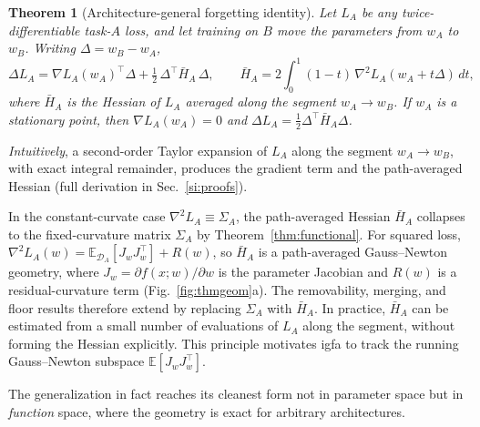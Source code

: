 \documentclass[10pt,a4paper]{article}
\theoremstyle{plain}
\newtheorem{theorem}{Theorem}
\theoremstyle{definition}
\newcommand{\Sig}{\Sigma}
\newcommand{\Del}{\Delta}
\newcommand{\IGFA}{igfa}
\begin{document}
\begin{theorem}[Architecture-general forgetting identity]
\label{thm:general}
Let $L_A$ be any twice-differentiable task-$A$ loss, and let training on $B$ move the
parameters from $w_A$ to $w_B$. Writing $\Del=w_B-w_A$,
\begin{equation}
\Del L_A=\nabla L_A(w_A)^\top\Del+\tfrac12\,\Del^\top \bar H_A\,\Del,
\qquad
\bar H_A=2\!\int_0^1(1-t)\,\nabla^2 L_A(w_A+t\Del)\,dt,
\label{eq:general}
\end{equation}
where $\bar H_A$ is the Hessian of $L_A$ averaged along the segment $w_A\!\to\!w_B$. If
$w_A$ is a stationary point, then $\nabla L_A(w_A)=0$ and
$\Del L_A=\tfrac12\Del^\top\bar H_A\Del$.
\end{theorem}
\noindent\emph{Intuitively}, a second-order Taylor expansion of $L_A$ along the segment
$w_A\!\to\!w_B$, with exact integral remainder, produces the gradient term and the
path-averaged Hessian (full derivation in Sec.~\ref{si:proofs}).

\noindent In the constant-curvate case $\nabla^2 L_A\equiv\Sig_A$, the path-averaged Hessian $\bar H_A$
collapses to the fixed-curvature matrix $\Sig_A$ by Theorem~\ref{thm:functional}.
For squared loss,
$\nabla^2 L_A(w)=\mathbb{E}_{\mathcal D_A}[J_w J_w^\top]+R(w)$, so $\bar H_A$ is a
path-averaged Gauss--Newton geometry, where $J_w=\partial f(x;w)/\partial w$ is the
parameter Jacobian and $R(w)$ is a residual-curvature term (Fig.~\ref{fig:thmgeom}a).
The removability, merging, and floor results therefore extend by replacing $\Sig_A$
with $\bar H_A$. In practice, $\bar H_A$ can be estimated from a small number of
evaluations of $L_A$ along the segment, without forming the Hessian explicitly. This principle motivates
 \IGFA{}  to track the running Gauss--Newton
subspace $\mathbb{E}[J_w J_w^\top]$.

The generalization in fact reaches its cleanest form not in parameter space but in
\emph{function} space, where the geometry is exact for arbitrary architectures.
\end{document}
